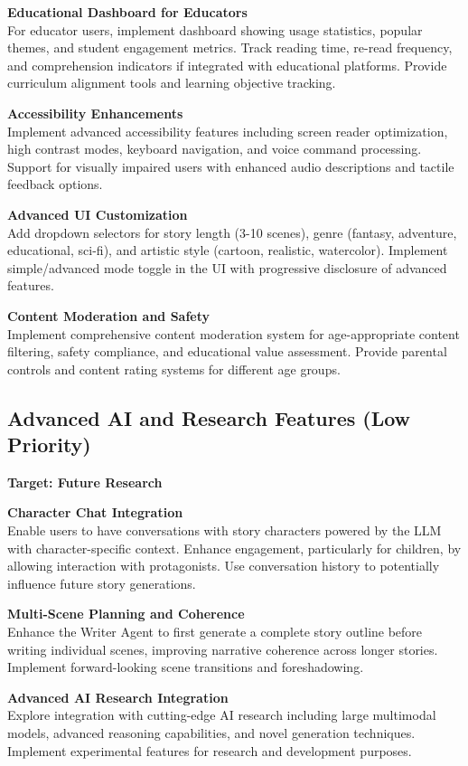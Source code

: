 \textbf{Educational Dashboard for Educators}\\
For educator users, implement dashboard showing usage statistics, popular themes, and student engagement metrics. Track reading time, re-read frequency, and comprehension indicators if integrated with educational platforms. Provide curriculum alignment tools and learning objective tracking.

\textbf{Accessibility Enhancements}\\
Implement advanced accessibility features including screen reader optimization, high contrast modes, keyboard navigation, and voice command processing. Support for visually impaired users with enhanced audio descriptions and tactile feedback options.

\textbf{Advanced UI Customization}\\
Add dropdown selectors for story length (3-10 scenes), genre (fantasy, adventure, educational, sci-fi), and artistic style (cartoon, realistic, watercolor). Implement simple/advanced mode toggle in the UI with progressive disclosure of advanced features.

\textbf{Content Moderation and Safety}\\
Implement comprehensive content moderation system for age-appropriate content filtering, safety compliance, and educational value assessment. Provide parental controls and content rating systems for different age groups.

\subsection{Advanced AI and Research Features (Low Priority)}
\textbf{Target: Future Research}

\textbf{Character Chat Integration}\\
Enable users to have conversations with story characters powered by the LLM with character-specific context. Enhance engagement, particularly for children, by allowing interaction with protagonists. Use conversation history to potentially influence future story generations.

\textbf{Multi-Scene Planning and Coherence}\\
Enhance the Writer Agent to first generate a complete story outline before writing individual scenes, improving narrative coherence across longer stories. Implement forward-looking scene transitions and foreshadowing.

\textbf{Advanced AI Research Integration}\\
Explore integration with cutting-edge AI research including large multimodal models, advanced reasoning capabilities, and novel generation techniques. Implement experimental features for research and development purposes.

